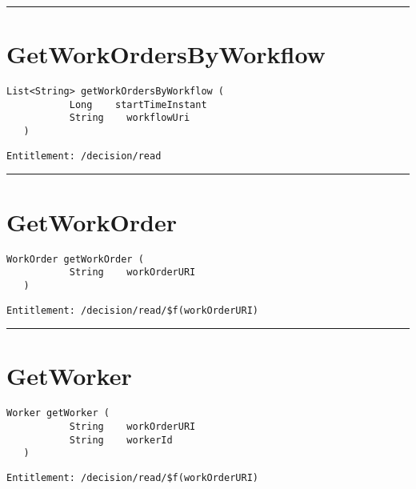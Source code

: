 \rule{12cm}{2pt}
\section{GetWorkOrdersByWorkflow}
\label{Api:GetWorkOrdersByWorkflow}
\begin{lstlisting}[style=nonumbers]
   List<String> getWorkOrdersByWorkflow (
           Long    startTimeInstant
           String    workflowUri
   )
\end{lstlisting}
\begin{Verbatim}[formatcom=\color{Maroon}]
  Entitlement: /decision/read
\end{Verbatim}



\rule{12cm}{2pt}
\section{GetWorkOrder}
\label{Api:GetWorkOrder}
\begin{lstlisting}[style=nonumbers]
   WorkOrder getWorkOrder (
           String    workOrderURI
   )
\end{lstlisting}
\begin{Verbatim}[formatcom=\color{Maroon}]
  Entitlement: /decision/read/$f(workOrderURI)
\end{Verbatim}



\rule{12cm}{2pt}
\section{GetWorker}
\label{Api:GetWorker}
\begin{lstlisting}[style=nonumbers]
   Worker getWorker (
           String    workOrderURI
           String    workerId
   )
\end{lstlisting}
\begin{Verbatim}[formatcom=\color{Maroon}]
  Entitlement: /decision/read/$f(workOrderURI)
\end{Verbatim}



